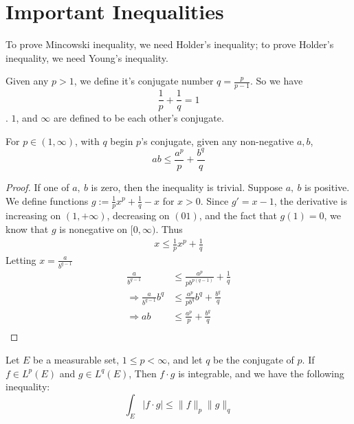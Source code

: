 \documentclass[lang=en, 12pt]{elegantbook}
\begin{document}
    \section{Important Inequalities}
        To prove Mincowski inequality, we need Holder's inequality; to prove 
    Holder's inequality, we need Young's inequality. 
        \begin{definition}
            Given any $p> 1$, we define it's conjugate number $q = \frac{p}{p-1}$.
        So we have $$\frac{1}{p} + \frac{1}{q} = 1$$. $1$, and $\infty$ are defined 
        to be each other's conjugate.
        \end{definition}
        \begin{proposition}
            For $p \in (1, \infty)$, with $q$ begin $p$'s conjugate, given any non-negative 
        $a,b$,
        $$ab \leq \frac{a^p}{p} +\frac{b^q}{q}$$
        \end{proposition}
        \begin{proof}
            If one of $a ,  \ b$ is zero, then the inequality is trivial.
        Suppose $a, \ b$ is positive. We define functions
        $g := \frac{1}{p}x^p + \frac{1}{q}-x$ for $x > 0$. Since $g' = x-1$,
        the derivative is increasing on $(1 , +\infty)$,
        decreasing on $(0 1)$, and the fact that $g(1) = 0$,
        we know that $g$ is nonegative on $[0, \infty)$.
            Thus 
            \begin{equation*}
                \begin{aligned}
                    x \leq \frac{1}{p}x^p + \frac{1}{q} 
                \end{aligned}
            \end{equation*}
            Letting $x = \frac{a}{b^{q-1}}$
            \begin{equation*}
                \begin{aligned}
                    \frac{a}{b^{q-1}} &\leq \frac{a^p}{pb^{p(q-1)}} + \frac{1}{q}\\
                    \Rightarrow \frac{a}{b^{q-1}}b^q &\leq \frac{a^p}{pb^q}b^q + \frac{b^q}{q}\\
                    \Rightarrow ab &\leq \frac{a^p}{p} + \frac{b^q}{q}\\
                \end{aligned}
            \end{equation*}
        \end{proof}
        \begin{theorem}
            Let $E$ be a measurable set, $1\leq p < \infty$, and let 
        $q$ be the conjugate of $p$. If $f \in L^p(E)$ and $g \in L^q(E)$,
        Then $f\cdot g$ is integrable, and we have the following inequality:
        \begin{equation}\label{HolderInequality}
            \int_E |f \cdot g| \leq \lVert f \rVert_p \lVert g \rVert_q 
        \end{equation}        
        \end{theorem}
\end{document}

